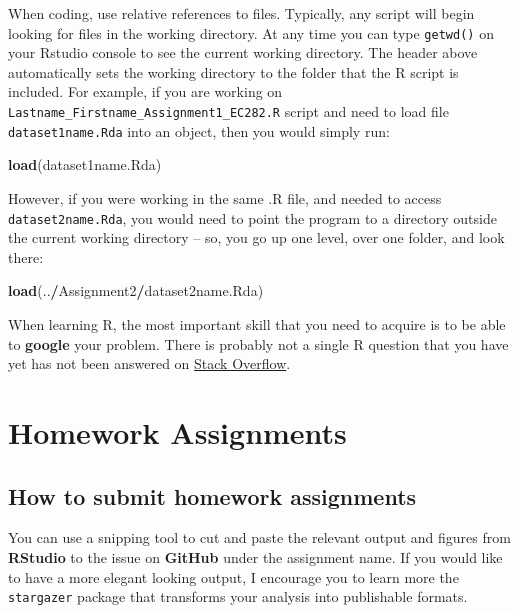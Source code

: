 \documentclass[
]{book}
\newenvironment{Shaded}{\begin{snugshade}}{\end{snugshade}}
\newcommand{\KeywordTok}[1]{\textcolor[rgb]{0.13,0.29,0.53}{\textbf{#1}}}
\newcommand{\NormalTok}[1]{#1}
\newcommand{\OperatorTok}[1]{\textcolor[rgb]{0.81,0.36,0.00}{\textbf{#1}}}
\begin{document}
When coding, use relative references to files. Typically, any script will begin looking for files in the working directory. At any time you can type \texttt{getwd()} on your Rstudio console to see the current working directory. The header above automatically sets the working directory to the folder that the R script is included. For example, if you are working on \texttt{Lastname\_Firstname\_Assignment1\_EC282.R} script and need to load file \texttt{dataset1name.Rda} into an object, then you would simply run:

\begin{Shaded}
\begin{Highlighting}[]
\KeywordTok{load}\NormalTok{(dataset1name.Rda)}
\end{Highlighting}
\end{Shaded}

However, if you were working in the same .R file, and needed to access \texttt{dataset2name.Rda}, you would need to point the program to a directory outside the current working directory -- so, you go up one level, over one folder, and look there:

\begin{Shaded}
\begin{Highlighting}[]
\KeywordTok{load}\NormalTok{(..}\OperatorTok{/}\NormalTok{Assignment2}\OperatorTok{/}\NormalTok{dataset2name.Rda)}
\end{Highlighting}
\end{Shaded}

When learning R, the most important skill that you need to acquire is to be able to \textbf{google} your problem. There is probably not a single R question that you have yet has not been answered on \href{https://stackoverflow.com/}{Stack Overflow}.

\hypertarget{homework-assignments}{%
\chapter{Homework Assignments}\label{homework-assignments}}

\hypertarget{how-to-submit-homework-assignments}{%
\section{How to submit homework assignments}\label{how-to-submit-homework-assignments}}

You can use a snipping tool to cut and paste the relevant output and figures from \textbf{RStudio} to the issue on \textbf{GitHub} under the assignment name. If you would like to have a more elegant looking output, I encourage you to learn more the \texttt{stargazer} package that transforms your analysis into publishable formats.
\end{document}

